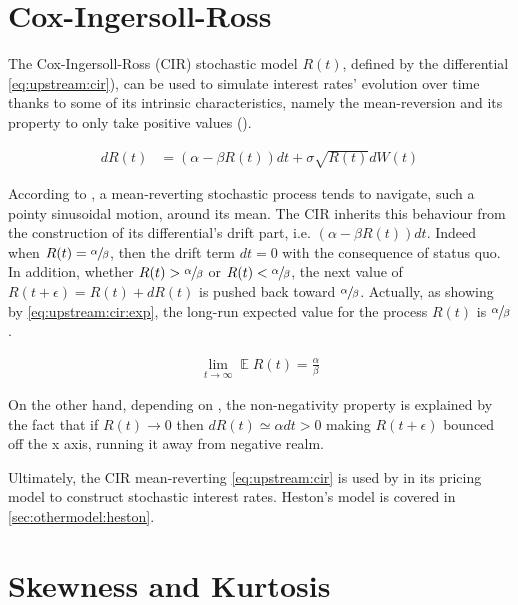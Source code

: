 \documentclass[a4paper, 12pt]{report}
\begin{document}
\section{Cox-Ingersoll-Ross}
\label{sec:CoxIngersollRoss}

The Cox-Ingersoll-Ross (CIR) stochastic model $R(t)$, defined by the differential \cref{eq:upstream:cir}), can be used to simulate interest rates' evolution over time thanks to some of its intrinsic characteristics, namely the mean-reversion and its property to only take positive values (\citet{shreve}).

\begin{align}
dR(t) &= (\alpha - \beta R(t)) dt + \sigma \sqrt{R(t)} dW(t)
\label{eq:upstream:cir}
\end{align}

According to \citet{shreve}, a  mean-reverting stochastic process tends to navigate, such a pointy sinusoidal motion, around its mean.
The CIR inherits this behaviour from the construction of its differential's drift part, i.e. $(\alpha - \beta R(t))dt$.
Indeed when $R(t) = \sfrac{\alpha}{\beta}$, then the drift term $dt = 0$ with the consequence of status quo.
In addition, whether $R(t) > \sfrac{\alpha}{\beta}$ or $R(t) < \sfrac{\alpha}{\beta}$, the next value of $R(t + \epsilon) = R(t) + dR(t)$ is pushed back toward $\sfrac{\alpha}{\beta}$.
Actually, as showing by \cref{eq:upstream:cir:exp}, the long-run expected value for the process $R(t)$ is $\sfrac{\alpha}{\beta}$.

\begin{align}
\lim_{t \to \infty}  \mathop{\mathbb{E}} R(t) = \frac{\alpha}{\beta} \label{eq:upstream:cir:exp}
\end{align}

On the other hand, depending on \citet{shreve}, the non-negativity property is explained by the fact that if $R(t) \to 0$ then $dR(t) \simeq \alpha dt > 0$ making $R(t+\epsilon)$ bounced off the x axis, running it away from negative realm.

Ultimately, the CIR mean-reverting \cref{eq:upstream:cir} is used by \citet{heston1993} in its pricing model to construct stochastic interest rates.
Heston's model is covered in \cref{sec:othermodel:heston}.



\section{Skewness and Kurtosis}
\label{sec:Moments}
\end{document}
